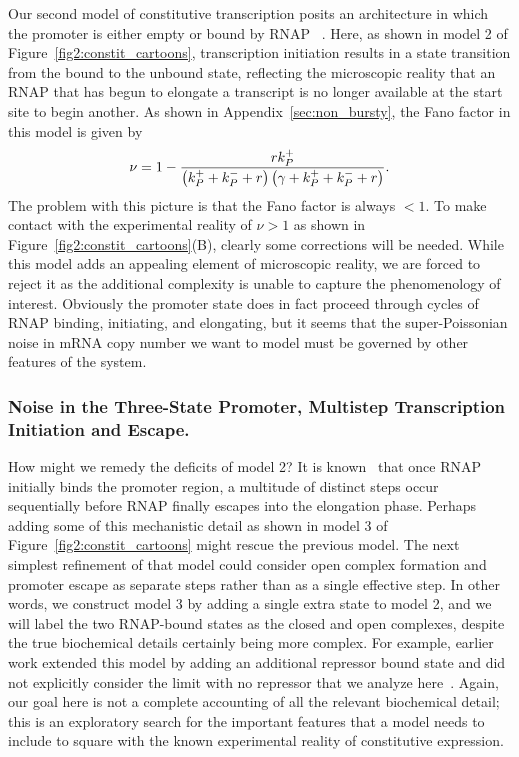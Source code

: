 Our second model of constitutive transcription posits an architecture in which
the promoter is either empty or bound by RNAP ~\cite{Phillips2015a,
Phillips2019}. Here,  as shown in model 2 of Figure~\ref{fig2:constit_cartoons},
transcription initiation results in a state transition from the bound to the
unbound state, reflecting the microscopic reality that an RNAP that has begun to
elongate a transcript is no longer available at the start site to begin another.
As shown in Appendix~\ref{sec:non_bursty}, the Fano factor in this model is
given by
\begin{align}
    \nu = 1 -
        \frac{r{k}_{P}^{+}}
            {\left({k}_{P}^{+} + {k}_{P}^{-} + r\right)
             \left(\gamma + {k}_{P}^{+} + {k}_{P}^{-} + r\right)}.
\label{eq:model2_fano}
\end{align}
The problem with this picture is that the Fano factor is always $<1$. To make
 contact with the experimental reality of $\nu>1$ as shown in
 Figure~\ref{fig2:constit_cartoons}(B), clearly some corrections will be needed.
 While this model adds an appealing element of microscopic reality, we are
 forced to reject it as the additional complexity is unable to capture the
 phenomenology of interest. Obviously the promoter state does in fact proceed
 through cycles of RNAP binding, initiating, and elongating, but it seems that
 the super-Poissonian noise in mRNA copy number we want to model must be
 governed by other features of the system.

\subsubsection{Noise in the Three-State Promoter, Multistep Transcription
Initiation and Escape.} 

How might we remedy the deficits of model 2? It is known~\cite{DeHaseth1998}
that once RNAP initially binds the promoter region, a multitude of distinct
steps occur sequentially before RNAP finally escapes into the elongation phase.
Perhaps adding some of this mechanistic detail as shown in model 3 of
Figure~\ref{fig2:constit_cartoons} might rescue the previous model. The next
simplest refinement of that model could consider open complex formation and
promoter escape as separate steps rather than as a single effective step. In
other words, we construct model 3 by adding a single extra state to model 2, and
we will label the two RNAP-bound states as the closed and open complexes,
despite the true biochemical details certainly being more complex. For example,
earlier work extended this model by adding an additional repressor bound state
and did not explicitly consider the limit with no repressor that we analyze
here~\cite{Mitarai2015}. Again, our goal here is not a complete accounting of
all the relevant biochemical detail; this is an exploratory search for the
important features that a model needs to include to square with the known
experimental reality of constitutive expression.

